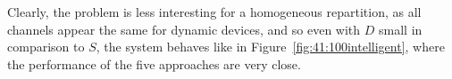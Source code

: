 Clearly, the problem is less interesting for a homogeneous repartition, as all channels appear the same for dynamic devices, and so even with $D$ small in comparison to $S$, the system behaves like in Figure~\ref{fig:41:100intelligent}, where the performance of the five approaches are very close.

\begin{figure}[!h]
    \centering
    \vspace*{-10pt}
\end{figure}
